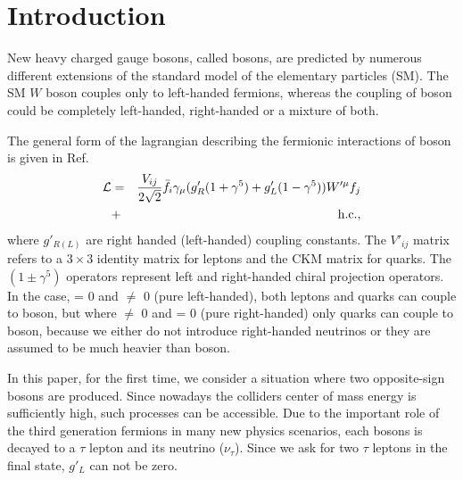 \section{Introduction}\label{sec:int} 
New heavy charged gauge bosons, called \wprime bosons, are predicted by numerous different extensions of the standard model of the elementary particles (SM). 
The SM $W$ boson couples only to left-handed fermions, whereas the coupling of \wprime boson could be completely left-handed, right-handed or a mixture of both. 

The general form of the lagrangian describing the fermionic interactions of \wprime boson is given in  Ref.~\cite{Sullivan:2002jt}
\begin{eqnarray}
{\cal L}& =& \frac{V_{ij}}{2\sqrt{2}}\bar{f_i} \gamma_{\mu}(g^\prime_{R} (1+{\gamma}^5)+
g^\prime_{L}
(1-{\gamma}^5)) W^{\prime \mu} f_j  \nonumber\\
&+& \mathrm{h.c.},
\end{eqnarray}
where $g'_{R(L)}$ are right handed (left-handed) coupling constants. The $V'_{ij}$ matrix refers to a $3\times3$ identity matrix for leptons and the CKM matrix for quarks. The $(1\pm{\gamma^5})$ operators represent left and right-handed chiral projection operators. In the case, \gR = 0 and \gL $\neq$ 0 (pure left-handed), both leptons and quarks can couple to \wprime boson, but where \gR $\neq$ 0 and \gL = 0 (pure right-handed) only quarks can couple to \wprime boson, because we either do not introduce right-handed neutrinos or they are assumed to be much heavier than \wprime boson. 

In this paper, for the first time, we consider a situation where two opposite-sign \wprime bosons are produced. Since nowadays the colliders center of mass energy is sufficiently high, such processes can be accessible. Due to the important role of the third generation fermions in many new physics scenarios, each \wprime bosons is decayed to a $\tau$ lepton and its neutrino ($\nu_{\tau}$). 
Since we ask for two $\tau$ leptons in the final state, $g'_L$ can not be zero. 

